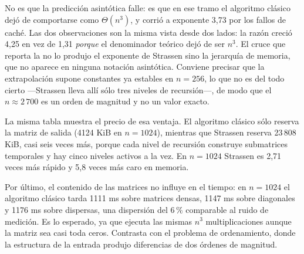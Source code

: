 No es que la predicción asintótica falle: es que en ese tramo el algoritmo
clásico dejó de comportarse como $\Theta(n^3)$, y corrió a exponente 3,73 por los
fallos de caché. Las dos observaciones son la misma vista desde dos lados: la
razón creció 4,25 en vez de 1,31 \emph{porque} el denominador teórico dejó de ser
$n^3$. El cruce que reporta la  no lo produjo el exponente
de Strassen sino la jerarquía de memoria, que no aparece en ninguna notación
asintótica. Conviene precisar que la extrapolación supone constantes ya estables
en $n = 256$, lo que no es del todo cierto ---Strassen lleva allí sólo tres
niveles de recursión---, de modo que el $n \approx 2\,700$ es un orden de
magnitud y no un valor exacto.

La misma tabla muestra el precio de esa ventaja. El algoritmo clásico sólo
reserva la matriz de salida (4124 KiB en $n = 1024$), mientras que Strassen
reserva 23\,808 KiB, casi seis veces más, porque cada nivel de recursión
construye submatrices temporales y hay cinco niveles activos a la vez. En
$n = 1024$ Strassen es 2,71 veces más rápido y 5,8 veces más caro en memoria.

Por último, el contenido de las matrices no influye en el tiempo: en $n = 1024$
el algoritmo clásico tarda 1111 ms sobre matrices densas, 1147 ms sobre
diagonales y 1176 ms sobre dispersas, una dispersión del 6\,\% comparable al
ruido de medición. Es lo esperado, ya que ejecuta las mismas $n^3$
multiplicaciones aunque la matriz sea casi toda ceros. Contrasta con el problema
de ordenamiento, donde la estructura de la entrada produjo diferencias de dos
órdenes de magnitud.

